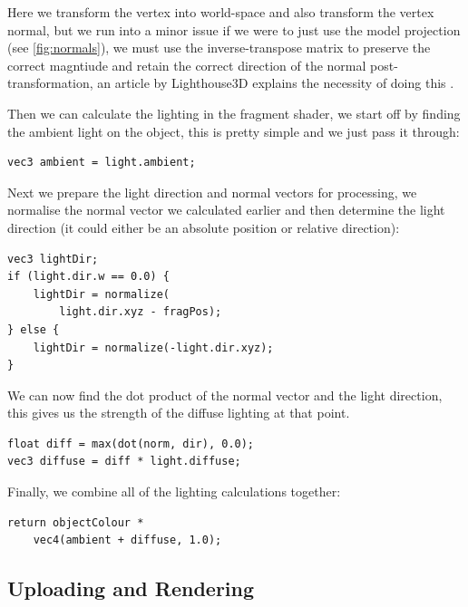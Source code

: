 \documentclass{article}
\begin{document}
\begin{multicols}{2}
                    Here we transform the vertex into world-space and also transform the vertex normal, but we run into a minor issue if we were to just use the model projection (see \autoref{fig:normals}), we must use the inverse-transpose matrix to preserve the correct magntiude and retain the correct direction of the normal post-transformation, an article by Lighthouse3D explains the necessity of doing this \cite{lighthouse3d}.

                    Then we can calculate the lighting in the fragment shader, we start off by finding the ambient light on the object, this is pretty simple and we just pass it through:

                    \begin{lstlisting}
vec3 ambient = light.ambient;\end{lstlisting}

                    Next we prepare the light direction and normal vectors for processing, we normalise the normal vector we calculated earlier and then determine the light direction (it could either be an absolute position or relative direction):

                    \begin{lstlisting}
vec3 lightDir;
if (light.dir.w == 0.0) {
    lightDir = normalize(
        light.dir.xyz - fragPos);
} else {
    lightDir = normalize(-light.dir.xyz);
}\end{lstlisting}

                    We can now find the dot product of the normal vector and the light direction, this gives us the strength of the diffuse lighting at that point.

                    \begin{lstlisting}
float diff = max(dot(norm, dir), 0.0);
vec3 diffuse = diff * light.diffuse;\end{lstlisting}

                    Finally, we combine all of the lighting calculations together:

                    \begin{lstlisting}
return objectColour *
    vec4(ambient + diffuse, 1.0);\end{lstlisting}

            \subsection{Uploading and Rendering}
            

\end{multicols}
\end{document}
